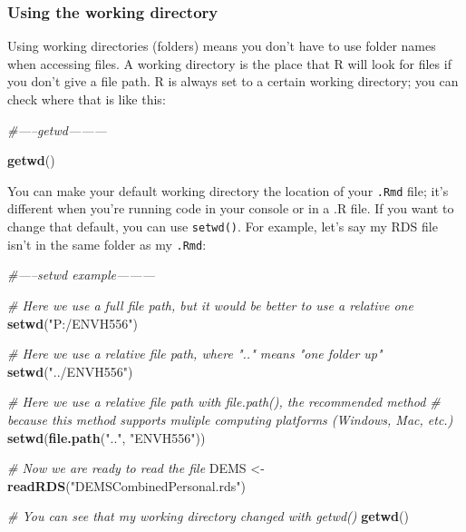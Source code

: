 \documentclass[
]{article}
\newenvironment{Shaded}{\begin{snugshade}}{\end{snugshade}}
\newcommand{\CommentTok}[1]{\textcolor[rgb]{0.56,0.35,0.01}{\textit{#1}}}
\newcommand{\KeywordTok}[1]{\textcolor[rgb]{0.13,0.29,0.53}{\textbf{#1}}}
\newcommand{\NormalTok}[1]{#1}
\newcommand{\StringTok}[1]{\textcolor[rgb]{0.31,0.60,0.02}{#1}}
\begin{document}
\hypertarget{using-the-working-directory}{%
\subsubsection{Using the working
directory}\label{using-the-working-directory}}

Using working directories (folders) means you don't have to use folder
names when accessing files. A working directory is the place that R will
look for files if you don't give a file path. R is always set to a
certain working directory; you can check where that is like this:

\begin{Shaded}
\begin{Highlighting}[]
\CommentTok{#-----getwd---------}

\KeywordTok{getwd}\NormalTok{()}
\end{Highlighting}
\end{Shaded}

You can make your default working directory the location of your
\texttt{.Rmd} file; it's different when you're running code in your
console or in a .R file. If you want to change that default, you can use
\texttt{setwd()}. For example, let's say my RDS file isn't in the same
folder as my \texttt{.Rmd}:

\begin{Shaded}
\begin{Highlighting}[]
\CommentTok{#-----setwd example---------}

\CommentTok{# Here we use a full file path, but it would be better to use a relative one}
\KeywordTok{setwd}\NormalTok{(}\StringTok{"P:/ENVH556"}\NormalTok{)}

\CommentTok{# Here we use a relative file path, where ".." means "one folder up"}
\KeywordTok{setwd}\NormalTok{(}\StringTok{"../ENVH556"}\NormalTok{)}

\CommentTok{# Here we use a relative file path with file.path(), the recommended method}
\CommentTok{# because this method supports muliple computing platforms (Windows, Mac, etc.)}
\KeywordTok{setwd}\NormalTok{(}\KeywordTok{file.path}\NormalTok{(}\StringTok{".."}\NormalTok{, }\StringTok{"ENVH556"}\NormalTok{))}

\CommentTok{# Now we are ready to read the file}
\NormalTok{DEMS <-}\StringTok{ }\KeywordTok{readRDS}\NormalTok{(}\StringTok{"DEMSCombinedPersonal.rds"}\NormalTok{)}

\CommentTok{# You can see that my working directory changed with getwd()}
\KeywordTok{getwd}\NormalTok{()}
\end{Highlighting}
\end{Shaded}
\end{document}

